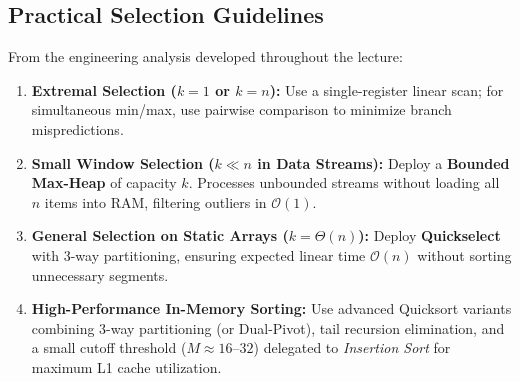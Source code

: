 \subsection{Practical Selection Guidelines}
From the engineering analysis developed throughout the lecture:
\begin{enumerate}
  \item \textbf{Extremal Selection ($k = 1$ or $k = n$):} Use a single-register linear scan; for simultaneous min/max, use pairwise comparison to minimize branch mispredictions.
  \item \textbf{Small Window Selection ($k \ll n$ in Data Streams):} Deploy a \textbf{Bounded Max-Heap} of capacity $k$. Processes unbounded streams without loading all $n$ items into RAM, filtering outliers in $\mathcal{O}(1)$.
  \item \textbf{General Selection on Static Arrays ($k = \Theta(n)$):} Deploy \textbf{Quickselect} with 3-way partitioning, ensuring expected linear time $\mathcal{O}(n)$ without sorting unnecessary segments.
  \item \textbf{High-Performance In-Memory Sorting:} Use advanced Quicksort variants combining 3-way partitioning (or Dual-Pivot), tail recursion elimination, and a small cutoff threshold ($M \approx 16$--$32$) delegated to \textit{Insertion Sort} for maximum L1 cache utilization.
\end{enumerate}
